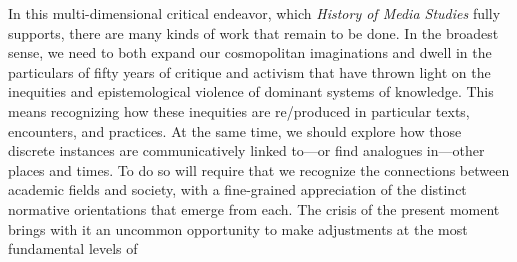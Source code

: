 \documentclass{tufte-handout}
\begin{document}
In this multi-dimensional critical endeavor, which \emph{History of
Media Studies} fully supports, there are many kinds of work that remain
to be done. In the broadest sense, we need to both expand our
cosmopolitan imaginations and dwell in the particulars of fifty years of
critique and activism that have thrown light on the inequities and
epistemological violence of dominant systems of knowledge. This means
recognizing how these inequities are re/produced in particular texts,
encounters, and practices. At the same time, we should explore how those
discrete instances are communicatively linked to---or find analogues
in---other places and times. To do so will require that we recognize the
connections between academic fields and society, with a fine-grained
appreciation of the distinct normative orientations that emerge from
each. The crisis of the present moment brings with it an uncommon
opportunity to make adjustments at the most fundamental levels of
\end{document}
